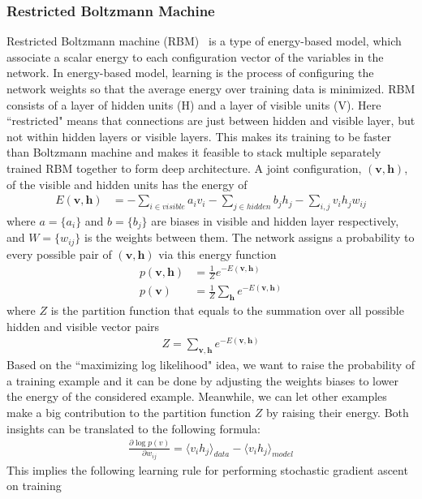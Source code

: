 \subsubsection{Restricted Boltzmann Machine}
Restricted Boltzmann machine (RBM)~\cite{RBMTechReport} is a type of energy-based model,
which associate a scalar energy to each configuration vector of the variables in the network.
In energy-based model, learning is the process of configuring the network weights so that
the average energy over training data is minimized.
RBM consists of a layer of hidden units (H) and a layer of visible units (V).
Here ``restricted" means that connections are just between hidden and visible layer,
but not within hidden layers or visible layers.
This makes its training to be faster than Boltzmann machine and makes it feasible to
stack multiple separately trained RBM together to form deep architecture.
A joint configuration, $(\mathbf{v, h})$, of the visible and hidden units has the energy of
\begin{align}
    E(\mathbf{v, h}) &= -\sum_{i\in visible}a_i v_i - \sum_{j\in hidden}b_j h_j - \sum_{i, j}v_i h_j w_{ij}
\end{align}
where $a=\{a_i\}$ and $b=\{b_j\}$ are biases in visible and hidden layer respectively,
and $W=\{w_{ij}\}$ is the weights between them.
The network assigns a probability to every possible pair of $(\mathbf{v, h})$ via this energy
function
\begin{align}
    p(\mathbf{v, h}) &= \frac{1}{Z} e^{-E(\mathbf{v, h})} \\
    p(\mathbf{v}) &= \frac{1}{Z} \sum_{\mathbf{h}} e^{-E(\mathbf{v, h})}
\end{align}
where $Z$ is the partition function that equals to the summation over all possible hidden
and visible vector pairs
\begin{align}
    Z = \sum_{\mathbf{v,h}} e^{-E(\mathbf{v, h})}
\end{align}
Based on the ``maximizing log likelihood" idea,
we want to raise the probability of a training example and it can be done by
adjusting the weights biases to lower the energy of the considered example.
Meanwhile, we can let other examples make a big contribution to the partition function $Z$
by raising their energy.
Both insights can be translated to the following formula:
\begin{align}
    \frac{\partial \log p(v)}{\partial w_{ij}} = \langle v_i h_j \rangle_{data} - \langle v_i h_j \rangle_{model} 
\end{align}
This implies the following learning rule for performing stochastic gradient ascent on training
